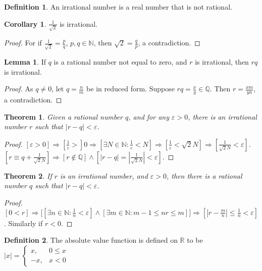 \documentclass[oneside]{book}
\newtheorem{theorem}{Theorem}[section]
\theoremstyle{definition}
\newtheorem{definition}{Definition}[section]
\newtheorem{lemma}{Lemma}[section]
\newtheorem{corollary}{Corollary}[section]
\begin{document}
\begin{definition}
An irrational number is a real number that is not rational.
\end{definition}

\begin{corollary}
$\frac{1}{\sqrt{2}}$ is irrational. 
\end{corollary}
\begin{proof}
For if $\frac{1}{\sqrt{2}} = \frac{p}{q}$, $p,q\in \mathbb{N}$, then $\sqrt{2} = \frac{q}{p}$, a contradiction.
\end{proof}

\begin{lemma}
If $q$ is a rational number not equal to zero, and $r$ is irrational, then $rq$ is irrational.
\end{lemma}
\begin{proof}
As $q\ne 0$, let $q = \frac{n}{m}$ be in reduced form. Suppose $rq = \frac{x}{y}\in \mathbb{Q}$. Then $r=\frac{xm}{yn}$, a contradiction.
\end{proof}

\begin{theorem}
Given a rational number $q$, and for any $\varepsilon>0$, there is an irrational number $r$ such that $|r-q|<\varepsilon$.
\end{theorem}
\begin{proof}
$[\varepsilon>0]\Rightarrow [\frac{1}{\varepsilon}>]0\Rightarrow [\exists N\in \mathbb{N}:\frac{1}{\varepsilon}<N]\Rightarrow [\frac{1}{\varepsilon} < \sqrt{2}N]\Rightarrow [\frac{1}{\sqrt{2}N}< \varepsilon]$. $[r \equiv q+\frac{1}{\sqrt{2}{N}}]\Rightarrow [r\notin \mathbb{Q}]\land [|r-q| = |\frac{1}{\sqrt{2}N}| < \varepsilon]$.
\end{proof}

\begin{theorem}
If $r$ is an irrational number, and $\varepsilon>0$, then there is a rational number $q$ such that $|r-q|<\varepsilon$.
\end{theorem}
\begin{proof}
$[0<r]\Rightarrow \big[[\exists n\in \mathbb{N}: \frac{1}{n} < \varepsilon]\land[\exists m\in \mathbb{N}: m-1\leq nr \leq m]\big]\Rightarrow[|r-\frac{m}{n}| \leq \frac{1}{n} < \varepsilon]$. Similarly if $r<0$.
\end{proof}

\begin{definition}
The absolute value function is defined on $\mathbb{R}$ to be $|x| = \begin{cases} x, & 0 \leq x \\ -x, & x<0 \end{cases}$
\end{definition}
\end{document}
